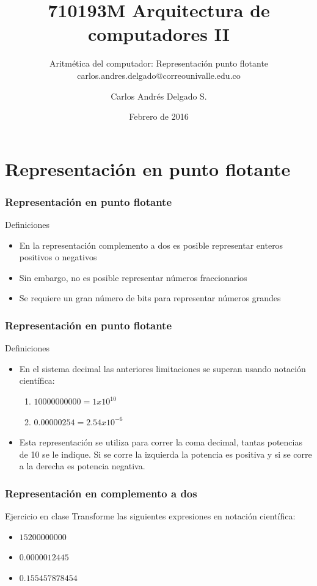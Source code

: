 \documentclass{beamer}
\author{Carlos Andr\'es Delgado S.}
\title{710193M Arquitectura de computadores II}
\subtitle{Aritmética del computador: Representación punto flotante \\ carlos.andres.delgado@correounivalle.edu.co}
\institute{Facultad de Ingeniería. Universidad del Valle}
\date{Febrero de 2016}
\begin{document}
\begin{frame}
	\titlepage	 		
\end{frame}

\begin{frame}
	\tableofcontents	 		
\end{frame}
\section{Representación en punto flotante}

\begin{frame}
	\frametitle{Representación en punto flotante}
	\begin{block}{Definiciones}
		\begin{itemize}
			\item En la representación complemento a dos es posible representar enteros positivos o negativos
			\item Sin embargo, no es posible representar números fraccionarios
			\item Se requiere un gran número de bits para representar números grandes
		\end{itemize}
	\end{block}	
\end{frame}

\begin{frame}
	\frametitle{Representación en punto flotante}
	\begin{block}{Definiciones}
		\begin{itemize}
			\item En el sistema decimal las anteriores limitaciones se superan usando notación científica:
			\begin{enumerate}
				\item $10000000000 = 1x10^{10}$
				\item $0.00000254 = 2.54x10^{-6}$
			\end{enumerate}
			\item Esta representación se utiliza para correr la coma decimal, tantas potencias de 10 se le indique. Si se corre la izquierda la potencia es positiva y si se corre a la derecha es potencia negativa.
		\end{itemize}
	\end{block}	
\end{frame}

\begin{frame}
	\frametitle{Representación en complemento a dos}
	\begin{block}{Ejercicio en clase}
	Transforme las siguientes expresiones en notación científica:
		\begin{itemize}
			\item $15200000000$
			\item $0.0000012445$
			\item $0.155457878454$
		\end{itemize}
	\end{block}	
\end{frame}
\end{document}
